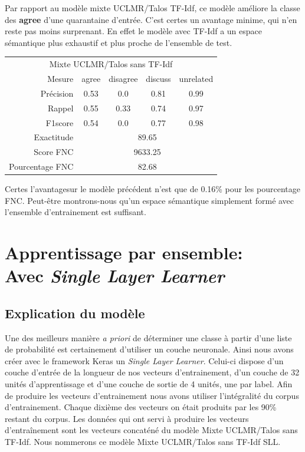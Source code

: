 \documentclass[11pt,a4paper,oldfontcommands]{memoir}
\begin{document}
Par rapport au modèle mixte UCLMR/Talos TF-Idf, ce modèle améliore la classe des \textbf{agree} d'une quarantaine d'entrée.
C'est certes un avantage minime, qui n'en reste pas moins surprenant.
En effet le modèle avec TF-Idf a un espace sémantique plus exhaustif et plus proche de l'ensemble de test.



\begin{center}
 \begin{tabular}{ r | c c c c }
  \multicolumn{5}{c}{Mixte UCLMR/Talos sans TF-Idf}                              \\
  Mesure          & agree                       & disagree & discuss & unrelated \\
  \hline
  Précision       & 0.53                        & 0.0      & 0.81    & 0.99      \\
  Rappel          & 0.55                        & 0.33     & 0.74    & 0.97      \\
  F1score         & 0.54                        & 0.0      & 0.77    & 0.98      \\
  \hline
  \hline
  Exactitude      & \multicolumn{4}{c}{89.65}                                    \\
  Score FNC       & \multicolumn{4}{c}{9633.25}                                  \\
  Pourcentage FNC & \multicolumn{4}{c}{82.68}                                    \\
 \end{tabular}
\end{center}

Certes l'avantagesur le modèle précédent n'est que de 0.16\% pour les pourcentage FNC.
Peut-être montrons-nous qu'un espace sémantique simplement formé avec l'ensemble d'entrainement est suffisant.



\section{Apprentissage par ensemble: \\ Avec \textit{Single Layer Learner}}
\subsection{Explication du modèle}
Une des meilleurs manière \textit{a priori} de déterminer une classe à partir d'une liste de probabilité est certainement d'utiliser un couche neuronale.
Ainsi nous avons créer avec le framework Keras un \textit{Single Layer Learner}.
Celui-ci dispose d'un couche d'entrée de la longueur de nos vecteurs d'entrainement, d'un couche de 32 unités d'apprentissage et d'une couche de sortie de 4 unités, une par label.
Afin de produire les vecteurs d'entrainement nous avons utiliser l'intégralité du corpus d'entrainement.
Chaque dixième des vecteurs on était produits par les 90\% restant du corpus.
Les données qui ont servi à produire les vecteurs d'entraînement sont les vecteurs concaténé du modèle Mixte UCLMR/Talos sans TF-Idf.
Nous nommerons ce modèle Mixte UCLMR/Talos sans TF-Idf SLL.
\end{document}
